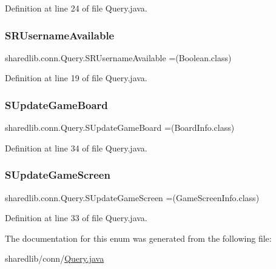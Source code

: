 Definition at line 24 of file Query.\+java.

\hypertarget{enumsharedlib_1_1conn_1_1_query_a98a79e98326c0c34f6bfeaf1e42f2648}{}\label{enumsharedlib_1_1conn_1_1_query_a98a79e98326c0c34f6bfeaf1e42f2648} 
\subsubsection{\texorpdfstring{S\+R\+Username\+Available}{SRUsernameAvailable}}
{\footnotesize\ttfamily sharedlib.\+conn.\+Query.\+S\+R\+Username\+Available =(Boolean.\+class)}



Definition at line 19 of file Query.\+java.

\hypertarget{enumsharedlib_1_1conn_1_1_query_ae0f80c1890732270ea7d20921a599f55}{}\label{enumsharedlib_1_1conn_1_1_query_ae0f80c1890732270ea7d20921a599f55} 
\subsubsection{\texorpdfstring{S\+Update\+Game\+Board}{SUpdateGameBoard}}
{\footnotesize\ttfamily sharedlib.\+conn.\+Query.\+S\+Update\+Game\+Board =(Board\+Info.\+class)}



Definition at line 34 of file Query.\+java.

\hypertarget{enumsharedlib_1_1conn_1_1_query_a167840e91edf75faabd1a05c7818f7cb}{}\label{enumsharedlib_1_1conn_1_1_query_a167840e91edf75faabd1a05c7818f7cb} 
\subsubsection{\texorpdfstring{S\+Update\+Game\+Screen}{SUpdateGameScreen}}
{\footnotesize\ttfamily sharedlib.\+conn.\+Query.\+S\+Update\+Game\+Screen =(Game\+Screen\+Info.\+class)}



Definition at line 33 of file Query.\+java.



The documentation for this enum was generated from the following file\+:\begin{DoxyCompactItemize}
\item 
sharedlib/conn/\hyperlink{_query_8java}{Query.\+java}\end{DoxyCompactItemize}
